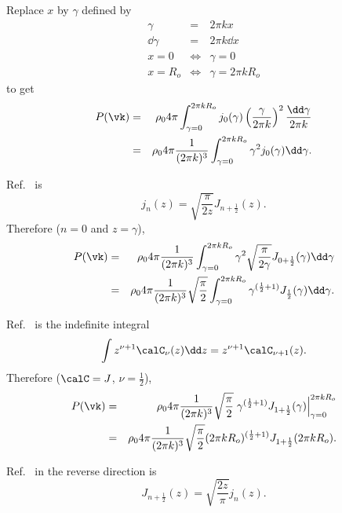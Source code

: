\documentclass{article}
\begin{document}
\par
Replace $x$ by $\gamma$ defined by
\begin{eqnarray}
\gamma
&=&
2\pi kx
\\
\dd\gamma
&=&
2\pi k \dd x
\\
x=0
&\Leftrightarrow&
\gamma=0
\\
x=R_o
&\Leftrightarrow&
\gamma=2\pi k R_o
\end{eqnarray}
to get
\begin{eqnarray}
P(\vk)
&=&
\rho_0
4\pi
\int_{\gamma=0}^{2\pi kR_o}
j_0(\gamma)
\left(\frac{\gamma}{2\pi k}\right)^2
\frac{\dd\gamma}{2\pi k}
\\
&=&
\rho_0
4\pi
\frac{1}{(2\pi k)^3}
\int_{\gamma=0}^{2\pi kR_o}
\gamma^2
j_0(\gamma)
\dd\gamma
.
\end{eqnarray}
\par
Ref.~\cite[Eq.~10.47.3]{OlverLozierBoisvertClark2010} is
\begin{equation}
j_n(z)
=
\sqrt{\frac{\pi}{2z}} J_{n+\frac{1}{2}}(z)
.
\end{equation}
Therefore ($n=0$ and $z=\gamma$),
\begin{eqnarray}
P(\vk)
&=&
\rho_0
4\pi
\frac{1}{(2\pi k)^3}
\int_{\gamma=0}^{2\pi kR_o}
\gamma^2
\sqrt{\frac{\pi}{2\gamma}} J_{0+\frac{1}{2}}(\gamma)
\dd\gamma
\\
&=&
\rho_0
4\pi
\frac{1}{(2\pi k)^3}
\sqrt{\frac{\pi}{2}}
\int_{\gamma=0}^{2\pi kR_o}
\gamma^{(\frac{1}{2}+1)}
J_{\frac{1}{2}}(\gamma)
\dd\gamma
.
\end{eqnarray}
\par
Ref.~\cite[Eq.~10.22.1]{OlverLozierBoisvertClark2010} is the indefinite integral
\begin{equation}
\int z^{\nu+1} \calC_\nu(z) \dd z
=
z^{\nu+1} \calC_{\nu+1}(z)
.
\end{equation}
Therefore ($\calC=J$, $\nu=\frac{1}{2}$),
\begin{eqnarray}
P(\vk)
&=&
\rho_0
4\pi
\frac{1}{(2\pi k)^3}
\sqrt{\frac{\pi}{2}}
\left.
\gamma^{(\frac{1}{2}+1)}
J_{1+\frac{1}{2}}(\gamma)
\right|_{\gamma=0}^{2\pi kR_o}
\\
&=&
\rho_0
4\pi
\frac{1}{(2\pi k)^3}
\sqrt{\frac{\pi}{2}}
(2\pi kR_o)^{(\frac{1}{2}+1)}
J_{1+\frac{1}{2}}(2\pi kR_o)
.
\end{eqnarray}
\par
Ref.~\cite[Eq.~10.47.3]{OlverLozierBoisvertClark2010} in the reverse direction is
\begin{equation}
J_{n+\frac{1}{2}}(z)
=
\sqrt{\frac{2z}{\pi}}
j_n(z)
.
\end{equation}
\end{document}
